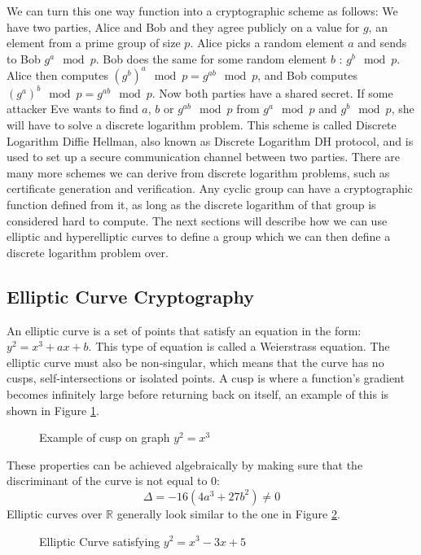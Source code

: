 We can turn this one way function into a cryptographic scheme as follows: We have two parties, Alice and Bob and they agree publicly on a value for $g$, an element from a prime group of size $p$. Alice picks a random element $a$ and sends to Bob $g^a\mod{p}$. Bob does the same for some random element $b$ : $g^b\mod{p}$. Alice then computes $(g^b)^a\mod{p} = g^{ab}\mod{p}$, and Bob computes $(g^a)^b\mod{p} = g^{ab}\mod{p}$. Now both parties have a shared secret. If some attacker Eve wants to find $a$, $b$ or $g^{ab}\mod{p}$ from $g^a\mod{p}$ and $g^b\mod{p}$, she will have to solve a discrete logarithm problem. This scheme is called Discrete Logarithm Diffie Hellman, also known as Discrete Logarithm DH protocol, and is used to set up a secure communication channel between two parties. There are many more schemes we can derive from discrete logarithm problems, such as certificate generation and verification. Any cyclic group can have a cryptographic function defined from it, as long as the discrete logarithm of that group is considered hard to compute. The next sections will describe how we can use elliptic and hyperelliptic curves to define a group which we can then define a discrete logarithm problem over.
\subsection{Elliptic Curve Cryptography}
An elliptic curve is a set of points that satisfy an equation in the form: $y^2 = x^3 + ax + b$. This type of equation is called a Weierstrass equation. The elliptic curve must also be non-singular, which means that the curve has no cusps, self-intersections or isolated points. A cusp is where a function's gradient becomes infinitely large before returning back on itself, an example of this is shown in Figure \ref{fig:cusp}.
\begin{figure}[!htb]
\centering
\resizebox{5cm}{!}{}
\caption{Example of cusp on graph $y^2 = x^3$}
\label{fig:cusp}
\end{figure}
These properties can be achieved algebraically by making sure that the discriminant of the curve is not equal to 0: $$\Delta = -16(4a^3+27b^2) \neq 0$$ Elliptic curves over $\mathbb{R}$ generally look similar to the one in Figure \ref{fig:ECC}.
\begin{figure}[!htb]
\centering
\resizebox{5cm}{!}{}
\caption{Elliptic Curve satisfying $y^2=x^3-3x+5$}\label{fig:ECC}
\end{figure}
